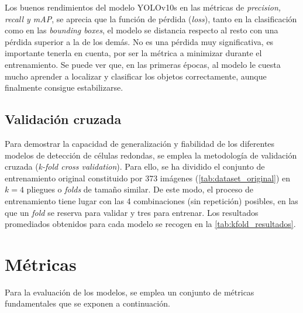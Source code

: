 \documentclass[12pt,a4paper,onecolumn,oneside]{report}
\begin{document}
Los buenos rendimientos del modelo YOLOv10s en las métricas de \textit{precision, recall y mAP}, se aprecia que la función de pérdida (\textit{loss}), tanto en la clasificación como en las \textit{bounding boxes},
el modelo se distancia respecto al resto con una pérdida superior a la de los demás. No es una pérdida muy significativa, es importante tenerla en cuenta, por ser la métrica a minimizar durante el entrenamiento.
Se puede ver que, en las primeras épocas, al modelo le cuesta mucho aprender a localizar y clasificar los objetos correctamente, aunque finalmente consigue estabilizarse.

\subsection{Validación cruzada}
\label{sec:Validación cruzada}

Para demostrar la capacidad de generalización y fiabilidad de los diferentes modelos de detección de células redondas, se emplea la metodología
de validación cruzada (\textit{k-fold cross validation}). Para ello, se ha dividido el conjunto de entrenamiento original constituido por 373 imágenes (\autoref{tab:dataset_original}) en $k=4$ pliegues o \textit{folds} de tamaño similar.
De este modo, el proceso de entrenamiento tiene lugar con las 4 combinaciones (sin repetición) posibles, en las que un \textit{fold} se reserva para validar y tres para entrenar. Los resultados promediados obtenidos para cada modelo se recogen en la \autoref{tab:kfold_resultados}.

\section{Métricas}
\label{sec:Métricas}
Para la evaluación de los modelos, se emplea un conjunto de métricas fundamentales que se exponen a continuación.
\end{document}
